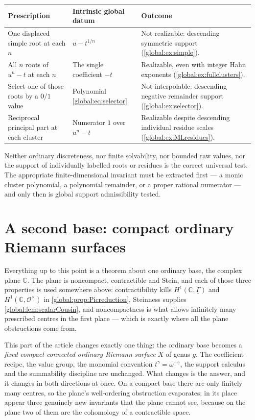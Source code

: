 \documentclass[11pt,letterpaper]{article}
\theoremstyle{definition}
\theoremstyle{remark}
\newcommand{\C}{\mathbb C}
\newcommand{\OO}{\mathcal O}
\numberwithin{equation}{section}
\begin{document}
\begin{center}\small
\begin{tabular}{@{}L{0.30\textwidth}L{0.28\textwidth}L{0.34\textwidth}@{}}
\toprule
Prescription & Intrinsic global datum & Outcome\\
\midrule
One displaced simple root at each $n$ & $u-t^{1/n}$ & Not realizable: descending symmetric support (\cref{global:ex:simple}).\\[0.45em]
All $n$ roots of $u^n-t$ at each $n$ & The single coefficient $-t$ & Realizable, even with integer Hahn exponents (\cref{global:ex:fullclusters}).\\[0.45em]
Select one of those roots by a $0/1$ value & Polynomial \eqref{global:eq:selector} & Not interpolable: descending negative remainder support (\cref{global:ex:selector}).\\[0.45em]
Reciprocal principal part at each cluster & Numerator $1$ over $u^n-t$ & Realizable despite descending individual residue scales (\cref{global:ex:MLresidues}).\\
\bottomrule
\end{tabular}
\end{center}

Neither ordinary discreteness, nor finite solvability, nor bounded raw values, nor the support of individually labelled roots or residues is the correct universal test. The appropriate finite-dimensional invariant must be extracted first --- a monic cluster polynomial, a polynomial remainder, or a proper rational numerator --- and only then is global support admissibility tested.

\section{A second base: compact ordinary Riemann surfaces}\label{global:sec:compactbridge}

Everything up to this point is a theorem about one ordinary base, the complex plane $\C$. The plane is noncompact, contractible and Stein, and each of those three properties is used somewhere above: contractibility kills $H^1(\C,\underline\Gamma)$ and $H^1(\C,\OO^\times)$ in \cref{global:prop:Picreduction}, Steinness supplies \cref{global:lem:scalarCousin}, and noncompactness is what allows infinitely many prescribed centres in the first place --- which is exactly where all the plane obstructions come from.

This part of the article changes exactly one thing: the ordinary base becomes a \emph{fixed compact connected ordinary Riemann surface} $X$ of genus $g$. The coefficient recipe, the value group, the monomial convention $t^\gamma=\omega^{-\gamma}$, the support calculus and the summability discipline are unchanged. What changes is the answer, and it changes in both directions at once. On a compact base there are only finitely many centres, so the plane's well-ordering obstruction evaporates; in its place appear three genuinely new invariants that the plane cannot see, because on the plane two of them are the cohomology of a contractible space.
\end{document}
